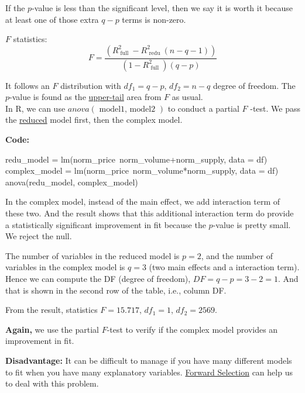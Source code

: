 \documentclass[12pt]{article}
\begin{document}
If the $ p $-value is less than the significant level, then we say
it is worth it because at least one of those extra $ q - p $ terms
is non-zero.


$ F $ statistics:
\begin{equation*}
F = \frac{
		(R_{\text{ full }}^{2} - R^{2}_{\text{ redu }}(n - q - 1))
}
{(1 - R^{2}_{\text{ full }})(q - p)}
\end{equation*}

It follows an $ F $ distribution with $ df_1 = q - p $, 
$ df_2 = n - q $ degree of freedom. The $ p $-value is found as the
{\underline {upper-tail}} area from $ F $ as usual.\\


In R, we can use $ anova(\text{ model1, model2 }) $ to conduct a
partial $ F $ -test.
We pass the {\underline {reduced}} model first, then the complex model.

{\textbf {Code:}}
\begin{rc}
redu_model = lm(norm_price~norm_volume+norm_supply, data = df)
complex_model = lm(norm_price~norm_volume*norm_supply, data = df)
anova(redu_model, complex_model)
\end{rc}

In the complex model, instead of the main effect, we add interaction 
term of these two. And the result shows that this additional interaction
term do provide a statistically significant improvement in fit because
the $ p $-value is pretty small. We reject the null.

The number of variables in the reduced model is $ p = 2 $, and the
number of variables in the complex model is $ q = 3 $ (two main effects
and a interaction term). Hence we can compute the DF (degree of 
freedom), $ DF = q - p = 3 - 2 = 1 $. And that is shown in the second
row of the table, i.e., column DF.

From the result, statistics $ F = 15.717 $, $ df_{1} = 1 $, 
$ df_2 = 2569 $.

{\textbf {Again,}} we use the partial $ F $-test to verify if the
complex model provides an improvement in fit.


{\textbf {Disadvantage:}} It can be difficult to manage if you have
many different models to fit when you have many explanatory variables.
{\underline {Forward Selection}} can help us to deal with this problem.
\end{document}
